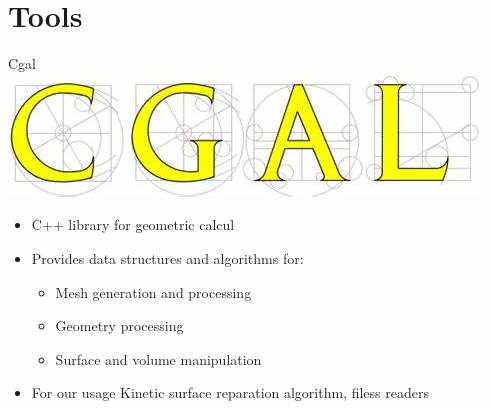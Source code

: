 \documentclass[10pt]{beamer}
\begin{document}
\section{Tools}
\begin{frame}{Cgal}
    \includegraphics[scale = 0.2]{../../images/CGAL_logo.png}
    \begin{itemize}
        \item C++ library for geometric calcul 
        \item Provides data structures and algorithms for:
        \begin{itemize}
            \item Mesh generation and processing
            \item Geometry processing
            \item Surface and volume manipulation
        \end{itemize}
        \item For our usage Kinetic surface reparation algorithm, filess readers
    \end{itemize}
\end{frame}
\end{document}
